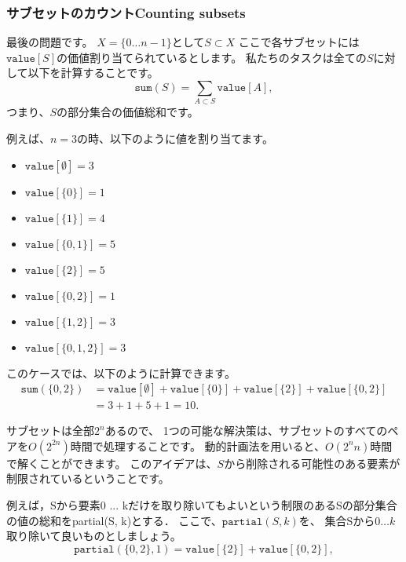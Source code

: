 \subsubsection{サブセットのカウントCounting subsets}

最後の問題です。
$X=\{0 \ldots n-1\}$として$S \subset X$
ここで各サブセットには$\texttt{value}[S]$の価値割り当てられているとします。
私たちのタスクは全ての$S$に対して以下を計算することです。
\[\texttt{sum}(S) = \sum_{A \subset S} \texttt{value}[A],\]
つまり、$S$の部分集合の価値総和です。

例えば、$n=3$の時、以下のように値を割り当てます。
\begin{multicols}{2}
\begin{itemize}
\item $\texttt{value}[\emptyset] = 3$
\item $\texttt{value}[\{0\}] = 1$
\item $\texttt{value}[\{1\}] = 4$
\item $\texttt{value}[\{0,1\}] = 5$
\item $\texttt{value}[\{2\}] = 5$
\item $\texttt{value}[\{0,2\}] = 1$
\item $\texttt{value}[\{1,2\}] = 3$
\item $\texttt{value}[\{0,1,2\}] = 3$
\end{itemize}
\end{multicols}
このケースでは、以下のように計算できます。
\begin{equation*}
\begin{split}
\texttt{sum}(\{0,2\}) &= \texttt{value}[\emptyset]+\texttt{value}[\{0\}]+\texttt{value}[\{2\}]+\texttt{value}[\{0,2\}] \\ 
                      &= 3 + 1 + 5 + 1 = 10.
\end{split}
\end{equation*}

サブセットは全部$2^n$あるので、
1つの可能な解決策は、サブセットのすべてのペアを$O(2^{2n})$時間で処理することです。
動的計画法を用いると、$O(2^n n)$時間で解くことができます。
このアイデアは、$S$から削除される可能性のある要素が制限されているということです。

例えば，Sから要素0 ... kだけを取り除いてもよいという制限のあるSの部分集合の値の総和をpartial(S, k)とする．
ここで、$\texttt{partial}(S,k)$を、
集合Sから$0 \ldots k$取り除いて良いものとしましょう。
\[\texttt{partial}(\{0,2\},1)=\texttt{value}[\{2\}]+\texttt{value}[\{0,2\}],\]

